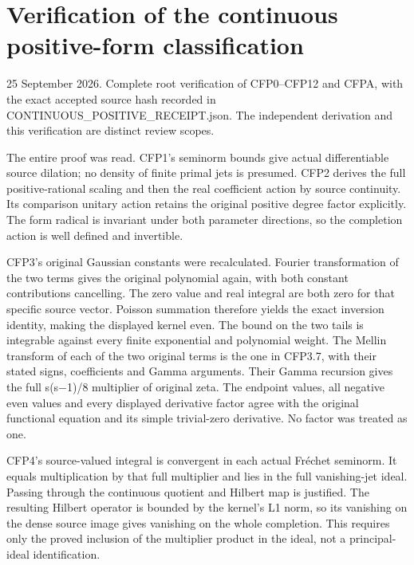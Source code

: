\section{Verification of the continuous positive-form
classification}\label{verification-of-the-continuous-positive-form-classification}

25 September 2026. Complete root verification of CFP0--CFP12 and CFPA,
with the exact accepted source hash recorded in
CONTINUOUS\_POSITIVE\_RECEIPT.json. The independent derivation and this
verification are distinct review scopes.

The entire proof was read. CFP1's seminorm bounds give actual
differentiable source dilation; no density of finite primal jets is
presumed. CFP2 derives the full positive-rational scaling and then the
real coefficient action by source continuity. Its comparison unitary
action retains the original positive degree factor explicitly. The form
radical is invariant under both parameter directions, so the completion
action is well defined and invertible.

CFP3's original Gaussian constants were recalculated. Fourier
transformation of the two terms gives the original polynomial again,
with both constant contributions cancelling. The zero value and real
integral are both zero for that specific source vector. Poisson
summation therefore yields the exact inversion identity, making the
displayed kernel even. The bound on the two tails is integrable against
every finite exponential and polynomial weight. The Mellin transform of
each of the two original terms is the one in CFP3.7, with their stated
signs, coefficients and Gamma arguments. Their Gamma recursion gives the
full s(s−1)/8 multiplier of original zeta. The endpoint values, all
negative even values and every displayed derivative factor agree with
the original functional equation and its simple trivial-zero derivative.
No factor was treated as one.

CFP4's source-valued integral is convergent in each actual Fréchet
seminorm. It equals multiplication by that full multiplier and lies in
the full vanishing-jet ideal. Passing through the continuous quotient
and Hilbert map is justified. The resulting Hilbert operator is bounded
by the kernel's L1 norm, so its vanishing on the dense source image
gives vanishing on the whole completion. This requires only the proved
inclusion of the multiplier product in the ideal, not a principal-ideal
identification.

